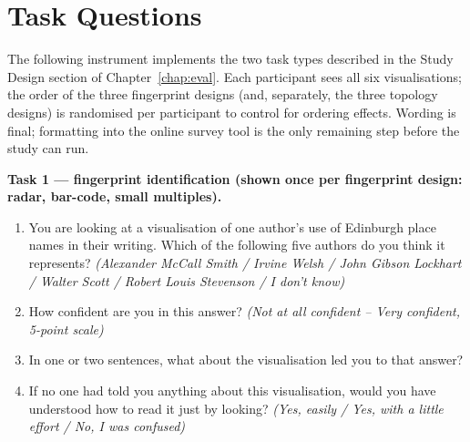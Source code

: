 \documentclass[logo,msc]{infthesis}
\begin{document}
\section{Task Questions}

The following instrument implements the two task types described in the Study Design section of Chapter~\ref{chap:eval}. Each participant sees all six visualisations; the order of the three fingerprint designs (and, separately, the three topology designs) is randomised per participant to control for ordering effects. Wording is final; formatting into the online survey tool is the only remaining step before the study can run.

\textbf{Task 1 --- fingerprint identification (shown once per fingerprint design: radar, bar-code, small multiples).}
\begin{enumerate}
  \item You are looking at a visualisation of one author's use of Edinburgh place names in their writing. Which of the following five authors do you think it represents? \emph{(Alexander McCall Smith / Irvine Welsh / John Gibson Lockhart / Walter Scott / Robert Louis Stevenson / I don't know)}
  \item How confident are you in this answer? \emph{(Not at all confident -- Very confident, 5-point scale)}
  \item In one or two sentences, what about the visualisation led you to that answer?
  \item If no one had told you anything about this visualisation, would you have understood how to read it just by looking? \emph{(Yes, easily / Yes, with a little effort / No, I was confused)}
\end{enumerate}
\end{document}
